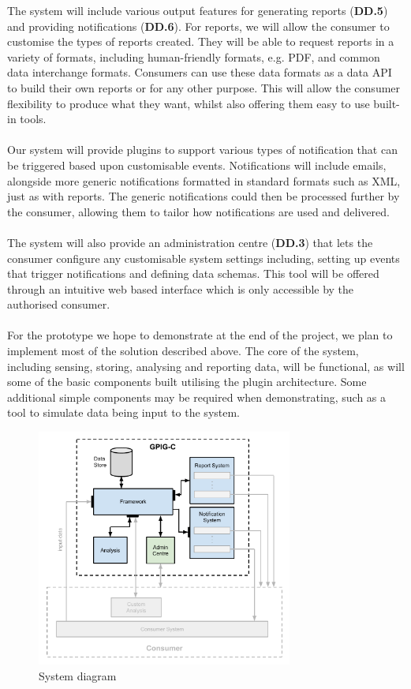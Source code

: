 \documentclass[10pt,a4paper]{article}
\begin{document}
The system will include various output features for generating reports
(\textbf{DD.5}) and providing notifications (\textbf{DD.6}). For reports, we
will allow the consumer to customise the types of reports created. They will be
able to request reports in a variety of formats, including human-friendly
formats, e.g. PDF, and common data interchange formats. Consumers can use these
data formats as a data API to build their own reports or for any other purpose.
This will allow the consumer flexibility to produce what they want, whilst also
offering them easy to use built-in tools.
\\ \\
Our system will provide plugins to support various types of notification that
can be triggered based upon customisable events. Notifications will include 
emails, alongside more generic notifications formatted in standard formats such
as XML, just as with reports. The generic notifications could then be processed
further by the consumer, allowing them to tailor how notifications are used and
delivered.
\\ \\
The system will also provide an administration centre (\textbf{DD.3}) that lets
the consumer configure any customisable system settings including, setting up
events that trigger notifications and defining data schemas. This tool will be
offered through an intuitive web based interface which is only accessible by the
authorised consumer.
\\ \\
For the prototype we hope to demonstrate at the end of the project, we plan to
implement most of the solution described above. The core of the system,
including sensing, storing, analysing and reporting data, will be functional,
as will some of the basic components built utilising the plugin architecture.
Some additional simple components may be required when demonstrating, such as a
tool to simulate data being input to the system. 



\begin{figure}[hptb]
  \centering
\includegraphics[width=0.75\textwidth]{system-architecture.pdf}
  \caption{System diagram}
\end{figure}
\end{document}
